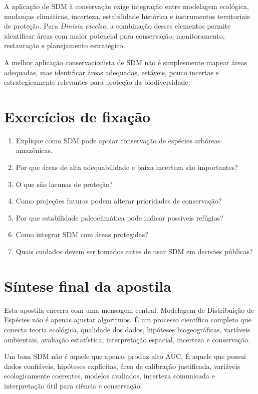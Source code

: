 \documentclass{ueap-sdm}
\begin{document}
A aplicação de SDM à conservação exige integração entre modelagem ecológica, mudanças climáticas, incerteza, estabilidade histórica e instrumentos territoriais de proteção. Para \textit{Dinizia excelsa}, a combinação desses elementos permite identificar áreas com maior potencial para conservação, monitoramento, restauração e planejamento estratégico.

\begin{conceito}[title={\faBook\quad Mensagem central}]
	A melhor aplicação conservacionista de SDM não é simplesmente mapear áreas adequadas, mas identificar áreas adequadas, estáveis, pouco incertas e estrategicamente relevantes para proteção da biodiversidade.
\end{conceito}

\section{Exercícios de fixação}

\begin{enumerate}
	\item Explique como SDM pode apoiar conservação de espécies arbóreas amazônicas.
	\item Por que áreas de alta adequabilidade e baixa incerteza são importantes?
	\item O que são lacunas de proteção?
	\item Como projeções futuras podem alterar prioridades de conservação?
	\item Por que estabilidade paleoclimática pode indicar possíveis refúgios?
	\item Como integrar SDM com áreas protegidas?
	\item Quais cuidados devem ser tomados antes de usar SDM em decisões públicas?
\end{enumerate}

\section{Síntese final da apostila}

Esta apostila encerra com uma mensagem central: Modelagem de Distribuição de Espécies não é apenas ajustar algoritmos. É um processo científico completo que conecta teoria ecológica, qualidade dos dados, hipóteses biogeográficas, variáveis ambientais, avaliação estatística, interpretação espacial, incerteza e conservação.

\begin{conceito}[title={\faBook\quad Mensagem final}]
	Um bom SDM não é aquele que apenas produz alto AUC. É aquele que possui dados confiáveis, hipóteses explícitas, área de calibração justificada, variáveis ecologicamente coerentes, modelos avaliados, incerteza comunicada e interpretação útil para ciência e conservação.
\end{conceito}
\end{document}
